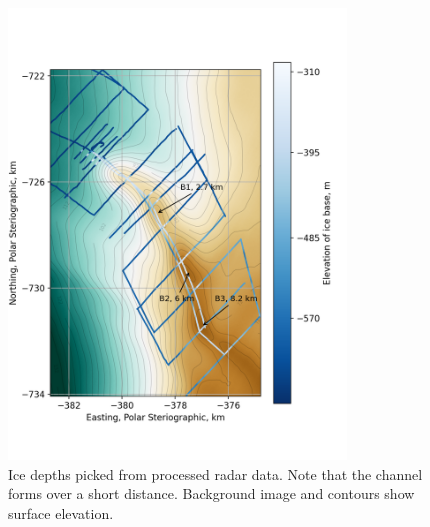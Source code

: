 \label{ch:appendix}


\begin{figure}[!ht]
\centering
\includegraphics[width=0.8\textwidth]{chapters/2/radarlines_surfcolour.png}
\caption[Radar line depths]{Ice depths picked from processed radar data. Note that the channel forms over a short distance. Background image and contours show surface elevation.}
\label{fig:radarlines_surfcoloure}
\end{figure}




